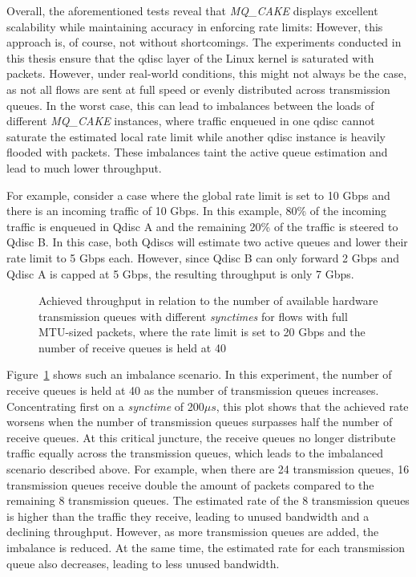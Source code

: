 Overall, the aforementioned tests reveal that \textit{MQ\_CAKE} displays excellent scalability while maintaining accuracy in enforcing rate limits:
%
However, this approach is, of course, not without shortcomings.
%
The experiments conducted in this thesis ensure that the qdisc layer of the Linux kernel is saturated with packets.
%
However, under real-world conditions, this might not always be the case, as not all flows are sent at full speed or evenly distributed across transmission queues.
%
In the worst case, this can lead to imbalances between the loads of different \textit{MQ\_CAKE} instances, where traffic enqueued in one qdisc cannot saturate the estimated local rate limit while another qdisc instance is heavily flooded with packets.
%
These imbalances taint the active queue estimation and lead to much lower throughput.
%

For example, consider a case where the global rate limit is set to 10 Gbps and there is an incoming traffic of 10 Gbps.
%
In this example, 80\% of the incoming traffic is enqueued in Qdisc A and the remaining 20\% of the traffic is steered to Qdisc B. In this case, both Qdiscs will estimate two active queues and lower their rate limit to 5 Gbps each.
However, since Qdisc B can only forward 2 Gbps and Qdisc A is capped at 5 Gbps, the resulting throughput is only 7 Gbps.
%
\begin{figure}[H]
    \centering
    
    \caption{Achieved throughput in relation to the number of available hardware transmission queues with different \textit{synctimes} for flows with full MTU-sized packets, where the rate limit is set to 20 Gbps and the number of receive queues is held at 40}\label{fig:txq_imbalance_1514}
\end{figure}
Figure~\ref{fig:txq_imbalance_1514} shows such an imbalance scenario.
%
In this experiment, the number of receive queues is held at 40 as the number of transmission queues increases.
%
Concentrating first on a \textit{synctime} of 200$\mu s$, this plot shows that the achieved rate worsens when the number of transmission queues surpasses half the number of receive queues.
%
At this critical juncture, the receive queues no longer distribute traffic equally across the transmission queues, which leads to the imbalanced scenario described above.
%
For example, when there are 24 transmission queues, 16 transmission queues receive double the amount of packets compared to the remaining 8 transmission queues.
%
The estimated rate of the 8 transmission queues is higher than the traffic they receive, leading to unused bandwidth and a declining throughput.
%
However, as more transmission queues are added, the imbalance is reduced. At the same time, the estimated rate for each transmission queue also decreases, leading to less unused bandwidth. 

